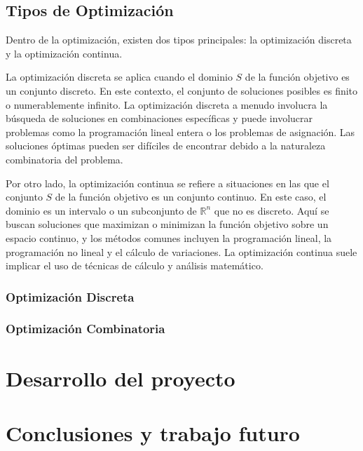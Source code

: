 \documentclass[12pt,titlepage,twoside,openright]{book}
\begin{document}
\section{Tipos de Optimizaci\'on}

Dentro de la optimizaci\'on, existen dos tipos principales: la optimizaci\'on discreta y la optimizaci\'on continua.

La optimizaci\'on discreta se aplica cuando el dominio \( S \) de la funci\'on objetivo es un conjunto discreto. En este contexto, el conjunto de soluciones posibles es finito o numerablemente infinito. La optimizaci\'on discreta a menudo involucra la b\'usqueda de soluciones en combinaciones espec\'ificas y puede involucrar problemas como la programaci\'on lineal entera o los problemas de asignaci\'on. Las soluciones \'optimas pueden ser dif\'iciles de encontrar debido a la naturaleza combinatoria del problema.

Por otro lado, la optimizaci\'on continua se refiere a situaciones en las que el conjunto \( S \) de la funci\'on objetivo es un conjunto continuo. En este caso, el dominio es un intervalo o un subconjunto de \( \mathbb{R}^n \) que no es discreto. Aqu\'i se buscan soluciones que maximizan o minimizan la funci\'on objetivo sobre un espacio continuo, y los m\'etodos comunes incluyen la programaci\'on lineal, la programaci\'on no lineal y el c\'alculo de variaciones. La optimizaci\'on continua suele implicar el uso de t\'ecnicas de c\'alculo y an\'alisis matem\'atico.

\subsection{Optimizaci\'on Discreta}

\subsection{Optimizaci\'on Combinatoria}


\chapter{Desarrollo del proyecto}

\chapter{Conclusiones y trabajo futuro}



\begin{thebibliography}{0}
		
\end{thebibliography}
\end{document}
